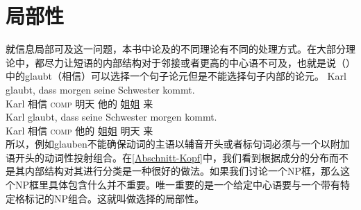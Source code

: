 
\section{局部性}
\label{Abschnitt-Diskussion-Lokalitaet}\label{sec-locality}

就信息局部可及这一问题，本书中论及的不同理论有不同的处理方式。在大部分理论中，都尽力让短语的内部结构对于邻接或者更高的中心语不可及，也就是说（）中的glaubt（相信）可以选择一个句子论元但是不能选择句子内部的论元。
\eal
\ex 
\gll Karl glaubt, dass morgen seine Schwester kommt.\\
	 Karl 相信 \textsc{comp} 明天 他的 姐姐 来\\
\ex 
\gll Karl glaubt, dass seine Schwester morgen kommt.\\
	 Karl 相信 \textsc{comp} 他的 姐姐 明天 来\\
\zl
所以，例如glauben不能确保动词的主语以辅音开头或者标句词必须与一个以附加语开头的动词性投射组合。在\ref{Abschnitt-Kopf}中，我们看到根据成分的分布而不是其内部结构对其进行分类是一种很好的做法。如果我们讨论一个NP框，那么这个NP框里具体包含什么并不重要。唯一重要的是一个给定中心语要与一个带有特定格标记的NP组合。这就叫做选择的局部性。

